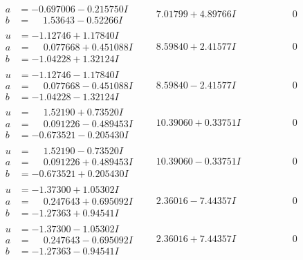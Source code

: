 \documentclass[1p]{elsarticle_modified}
\theoremstyle{definition}
\begin{document}
$$\begin{array}{c|c|c}
\begin{aligned}
a &= -0.697006 - 0.215750 I \\
b &= \phantom{-}1.53643 - 0.52266 I\end{aligned}
 & \phantom{-}7.01799 + 4.89766 I & \phantom{-0.000000 } 0 \\ \hline\begin{aligned}
u &= -1.12746 + 1.17840 I \\
a &= \phantom{-}0.077668 + 0.451088 I \\
b &= -1.04228 + 1.32124 I\end{aligned}
 & \phantom{-}8.59840 + 2.41577 I & \phantom{-0.000000 } 0 \\ \hline\begin{aligned}
u &= -1.12746 - 1.17840 I \\
a &= \phantom{-}0.077668 - 0.451088 I \\
b &= -1.04228 - 1.32124 I\end{aligned}
 & \phantom{-}8.59840 - 2.41577 I & \phantom{-0.000000 } 0 \\ \hline\begin{aligned}
u &= \phantom{-}1.52190 + 0.73520 I \\
a &= \phantom{-}0.091226 - 0.489453 I \\
b &= -0.673521 - 0.205430 I\end{aligned}
 & \phantom{-}10.39060 + 0.33751 I & \phantom{-0.000000 } 0 \\ \hline\begin{aligned}
u &= \phantom{-}1.52190 - 0.73520 I \\
a &= \phantom{-}0.091226 + 0.489453 I \\
b &= -0.673521 + 0.205430 I\end{aligned}
 & \phantom{-}10.39060 - 0.33751 I & \phantom{-0.000000 } 0 \\ \hline\begin{aligned}
u &= -1.37300 + 1.05302 I \\
a &= \phantom{-}0.247643 + 0.695092 I \\
b &= -1.27363 + 0.94541 I\end{aligned}
 & \phantom{-}2.36016 - 7.44357 I & \phantom{-0.000000 } 0 \\ \hline\begin{aligned}
u &= -1.37300 - 1.05302 I \\
a &= \phantom{-}0.247643 - 0.695092 I \\
b &= -1.27363 - 0.94541 I\end{aligned}
 & \phantom{-}2.36016 + 7.44357 I & \phantom{-0.000000 } 0\\

\end{array}$$
\end{document}

